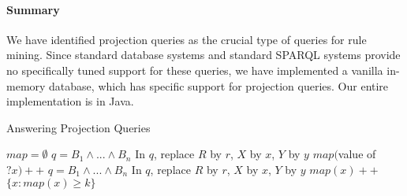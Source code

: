 \paragraph{Summary} We have identified projection queries as the crucial type of queries for rule mining. Since standard database systems and standard SPARQL systems provide no specifically tuned support for these queries, we have implemented a vanilla in-memory database, which has specific support for projection queries. Our entire implementation is in Java.

\begin{algorithm}
\caption{Answering Projection Queries}
\label{algi}
\begin{algorithmic}
    \State $map = \emptyset$
	    \State $q=B_1 \wedge ... \wedge B_n$
		\State In $q$, replace $R$ by $r$, $X$ by $x$, $Y$ by $y$
		\State $map($value of $?x)++$
		\EndIf
	  \EndFor
	\Else 
	    \State $q=B_1 \wedge ... \wedge B_n$
		\State In $q$, replace $R$ by $r$, $X$ by $x$, $Y$ by $y$
		  \State $map(x)++$
		\EndFor
	  \EndFor
	\EndIf    
	\State \Return $\{ x : map(x)\geq k \}$
\EndFunction
\end{algorithmic}
\end{algorithm}
\ \\[-1cm]